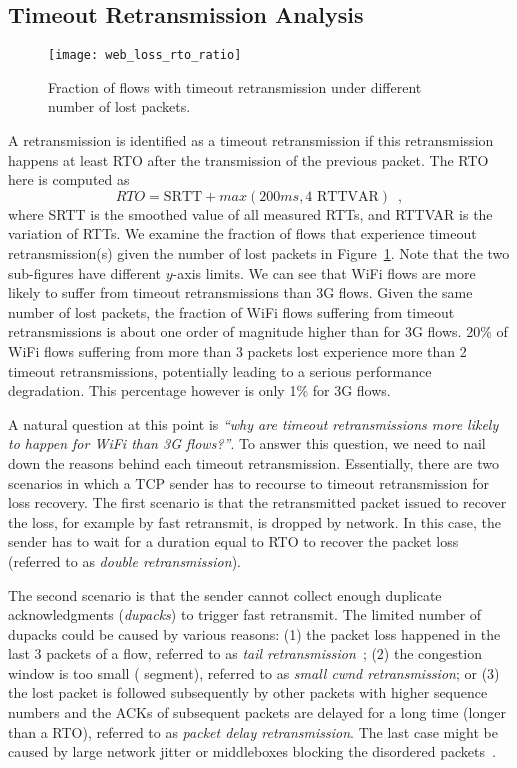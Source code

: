 \subsection{Timeout Retransmission Analysis}

\begin{figure}[th]
\centering
\texttt{[image: web\_loss\_rto\_ratio]}
\caption{Fraction of flows with timeout retransmission under different number of lost packets.}
\label{fig:web_loss_rto_ratio}
\minsqueeze
\end{figure}

A retransmission is identified as a timeout retransmission if this retransmission happens at least RTO after the transmission of the previous packet. The RTO here is computed as~\cite{rfc62982011computing} $$RTO=\text{SRTT} + max(200ms, 4 \text{ RTTVAR}) \enspace ,$$ where SRTT is the smoothed value of all measured RTTs, and RTTVAR is the variation of RTTs. We examine the fraction of flows that experience timeout retransmission(s) given the number of lost packets in Figure~\ref{fig:web_loss_rto_ratio}. Note that the two sub-figures have different $y$-axis limits. We can see that WiFi flows are more likely to suffer from timeout retransmissions than 3G flows. Given the same number of lost packets, the fraction of WiFi flows suffering from timeout retransmissions is about one order of magnitude higher than for 3G flows. 20\% of WiFi flows suffering from more than 3 packets lost experience more than 2 timeout retransmissions, potentially leading to a serious performance degradation. This percentage however is only 1\% for 3G flows.

A natural question at this point is \textit{``why are timeout retransmissions more likely to happen for WiFi than 3G flows?''}. To answer this question, we need to nail down the reasons behind each timeout retransmission. Essentially, there are two scenarios in which a TCP sender has to recourse to timeout retransmission for loss recovery. The first scenario is that the retransmitted packet issued to recover the loss, for example by fast retransmit, is dropped by network. In this case, the sender has to wait for a duration equal to RTO to recover the packet loss (referred to as \emph{double retransmission}). 

The second scenario is that the sender cannot collect enough duplicate acknowledgments (\emph{dupacks}) to trigger fast retransmit. The limited number of dupacks could be caused by various reasons: (1) the packet loss happened in the last 3 packets of a flow, referred to as \emph{tail retransmission}~\cite{flach2013reducing}; (2) the congestion window is too small ( segment), referred to as \emph{small cwnd retransmission}; or (3) the lost packet is followed subsequently by other packets with higher sequence numbers and the ACKs of subsequent packets are delayed for a long time (longer than a RTO), referred to as \emph{packet delay retransmission}. The last case might be caused by large network jitter or middleboxes blocking the disordered packets~\cite{Wang:2011:USM:2018436.2018479}.

